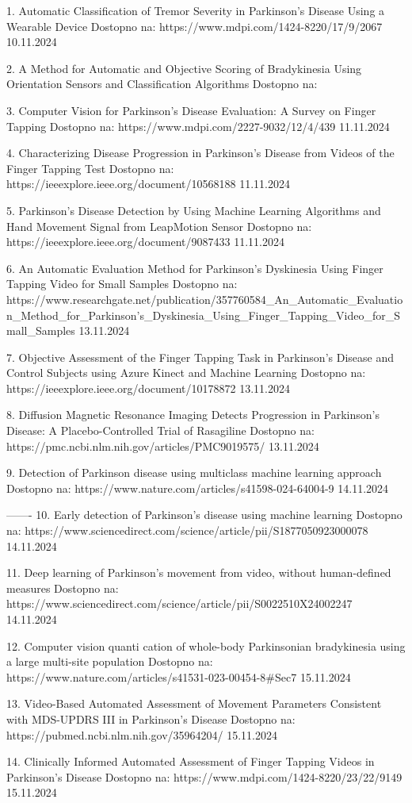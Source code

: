 1. Automatic Classification of Tremor Severity in Parkinson’s Disease Using a Wearable Device
Dostopno na: https://www.mdpi.com/1424-8220/17/9/2067
10.11.2024

2. A Method for Automatic and Objective Scoring of Bradykinesia Using Orientation Sensors and Classification Algorithms
Dostopno na: 

3. Computer Vision for Parkinson’s Disease Evaluation: A Survey on Finger Tapping
Dostopno na: https://www.mdpi.com/2227-9032/12/4/439
11.11.2024

4. Characterizing Disease Progression in Parkinson’s Disease from Videos of the Finger Tapping Test
Dostopno na: https://ieeexplore.ieee.org/document/10568188
11.11.2024

5. Parkinson’s Disease Detection by Using Machine Learning Algorithms and Hand Movement Signal from LeapMotion Sensor
Dostopno na: https://ieeexplore.ieee.org/document/9087433
11.11.2024

6. An Automatic Evaluation Method for Parkinson's Dyskinesia Using Finger Tapping Video for Small Samples
Dostopno na: https://www.researchgate.net/publication/357760584_An_Automatic_Evaluation_Method_for_Parkinson's_Dyskinesia_Using_Finger_Tapping_Video_for_Small_Samples 
13.11.2024

7. Objective Assessment of the Finger Tapping Task in Parkinson’s Disease and Control Subjects using Azure Kinect and Machine Learning
Dostopno na: https://ieeexplore.ieee.org/document/10178872
13.11.2024

8. Diffusion Magnetic Resonance Imaging Detects Progression in Parkinson’s Disease: A Placebo-Controlled Trial of Rasagiline
Dostopno na: https://pmc.ncbi.nlm.nih.gov/articles/PMC9019575/
13.11.2024

9. Detection of Parkinson disease using multiclass machine learning approach
Dostopno na: https://www.nature.com/articles/s41598-024-64004-9
14.11.2024

-------
10. Early detection of Parkinson’s disease using machine learning
Dostopno na: https://www.sciencedirect.com/science/article/pii/S1877050923000078
14.11.2024

11. Deep learning of Parkinson's movement from video, without human-defined measures
Dostopno na: https://www.sciencedirect.com/science/article/pii/S0022510X24002247
14.11.2024

12. Computer vision quanti cation of whole-body Parkinsonian bradykinesia using a large multi-site population
Dostopno na: https://www.nature.com/articles/s41531-023-00454-8#Sec7
15.11.2024

13. Video-Based Automated Assessment of Movement Parameters Consistent with MDS-UPDRS III in Parkinson's Disease
Dostopno na: https://pubmed.ncbi.nlm.nih.gov/35964204/
15.11.2024

14. Clinically Informed Automated Assessment of Finger Tapping Videos in Parkinson’s Disease
Dostopno na: https://www.mdpi.com/1424-8220/23/22/9149
15.11.2024

